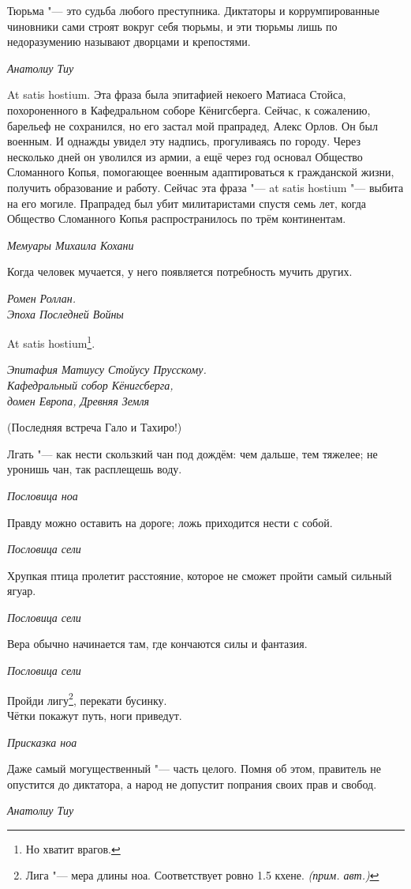 \documentclass[a4paper,10pt,fleqn]{book}
\newcommand{\authornote}{\textit{(прим. авт.)}}
\begin{document}
\epigraph{Тюрьма "--- это судьба любого преступника.
Диктаторы и коррумпированные чиновники сами строят вокруг себя тюрьмы, и эти тюрьмы лишь по недоразумению называют дворцами и крепостями.}
{\textit{Анатолиу Тиу}}

\epigraph{At satis hostium.
Эта фраза была эпитафией некоего Матиаса Стойса, похороненного в Кафедральном соборе Кёнигсберга.
Сейчас, к сожалению, барельеф не сохранился, но его застал мой прапрадед, Алекс Орлов.
Он был военным.
И однажды увидел эту надпись, прогуливаясь по городу.
Через несколько дней он уволился из армии, а ещё через год основал Общество Сломанного Копья, помогающее военным адаптироваться к гражданской жизни, получить образование и работу.
Сейчас эта фраза "--- at satis hostium "--- выбита на его могиле.
Прапрадед был убит милитаристами спустя семь лет, когда Общество Сломанного Копья распространилось по трём континентам.}
{\textit{Мемуары Михаила Кохани}}

\epigraph{Когда человек мучается, у него появляется потребность мучить других.}
{\textit{Ромен Роллан.\\Эпоха Последней Войны}}

\epigraph{At satis hostium\footnote{Но хватит врагов.}.}
{\textit{Эпитафия Матиусу Стойусу Прусскому.\\Кафедральный собор
Кёнигсберга,\\домен Европа, Древняя Земля}}

(Последняя встреча Гало и Тахиро!)

\epigraph{Лгать "--- как нести скользкий чан под дождём: чем дальше, тем тяжелее;
не уронишь чан, так расплещешь воду.}
{\textit{Пословица ноа}}

\epigraph{Правду можно оставить на дороге;
ложь приходится нести с собой.}
{\textit{Пословица сели}}

\epigraph{Хрупкая птица пролетит расстояние, которое не сможет пройти самый сильный ягуар.}
{\textit{Пословица сели}}

\epigraph{Вера обычно начинается там, где кончаются силы и фантазия.}
{\textit{Пословица сели}}

\epigraph{Пройди лигу\footnote
{Лига "--- мера длины ноа. Соответствует ровно 1.5 кхене. \authornote}, перекати бусинку.\\
Чётки покажут путь, ноги приведут.}
{\textit{Присказка ноа}}

\epigraph{Даже самый могущественный "--- часть целого.
Помня об этом, правитель не опустится до диктатора, а народ не допустит попрания своих прав и свобод.}
{\textit{Анатолиу Тиу}}
\end{document}
